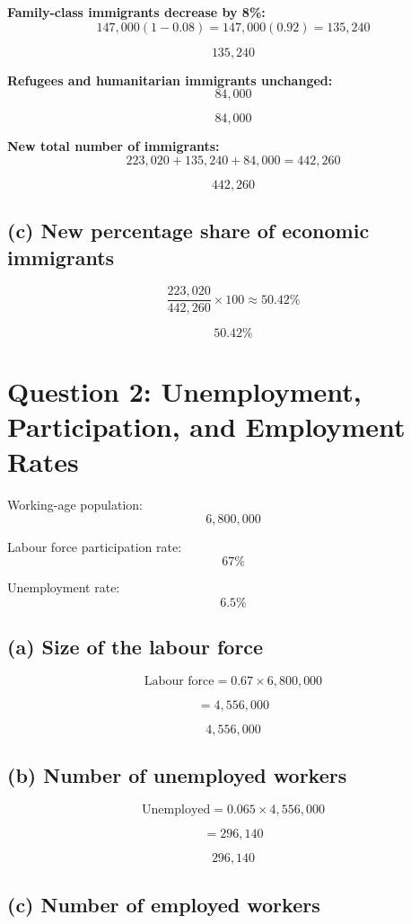 \documentclass[12pt]{article}
\begin{document}
\textbf{Family-class immigrants decrease by 8\%:}
\[
147{,}000(1-0.08)=147{,}000(0.92)=135{,}240
\]

\[
\boxed{135{,}240}
\]

\textbf{Refugees and humanitarian immigrants unchanged:}
\[
84{,}000
\]

\[
\boxed{84{,}000}
\]

\textbf{New total number of immigrants:}
\[
223{,}020 + 135{,}240 + 84{,}000 = 442{,}260
\]

\[
\boxed{442{,}260}
\]

\subsection*{(c) New percentage share of economic immigrants}

\[
\frac{223{,}020}{442{,}260}\times 100 \approx 50.42\%
\]

\[
\boxed{50.42\%}
\]

\vspace{1em}

\section*{Question 2: Unemployment, Participation, and Employment Rates}

Working-age population:
\[
6{,}800{,}000
\]

Labour force participation rate:
\[
67\%
\]

Unemployment rate:
\[
6.5\%
\]

\subsection*{(a) Size of the labour force}

\[
\text{Labour force} = 0.67 \times 6{,}800{,}000
\]

\[
= 4{,}556{,}000
\]

\[
\boxed{4{,}556{,}000}
\]

\subsection*{(b) Number of unemployed workers}

\[
\text{Unemployed} = 0.065 \times 4{,}556{,}000
\]

\[
= 296{,}140
\]

\[
\boxed{296{,}140}
\]

\subsection*{(c) Number of employed workers}
\end{document}
